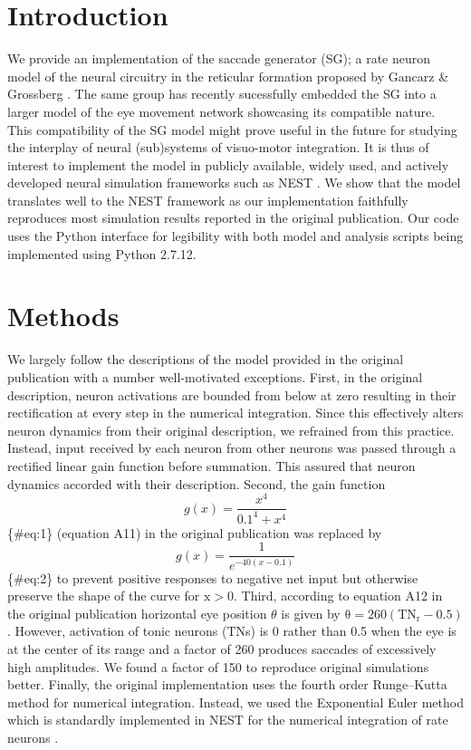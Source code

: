 \documentclass[10pt,a4paper,onecolumn]{article}
\begin{document}
\section{Introduction}\label{introduction}

We provide an implementation of the saccade generator (SG); a rate
neuron model of the neural circuitry in the reticular formation proposed
by Gancarz \& Grossberg \autocite{Gancarz1998}. The same group has
recently sucessfully embedded the SG into a larger model of the eye
movement network \autocite{Grossberg2012} showcasing its compatible
nature. This compatibility of the SG model might prove useful in the
future for studying the interplay of neural (sub)systems of visuo-motor
integration. It is thus of interest to implement the model in publicly
available, widely used, and actively developed neural simulation
frameworks such as NEST \autocite{Gewaltig2007}. We show that the model
translates well to the NEST framework as our implementation faithfully
reproduces most simulation results reported in the original publication.
Our code uses the Python interface \autocite{Eppler2008} for legibility
with both model and analysis scripts being implemented using Python
2.7.12.

\section{Methods}\label{methods}

We largely follow the descriptions of the model provided in the original
publication with a number well-motivated exceptions. First, in the
original description, neuron activations are bounded from below at zero
resulting in their rectification at every step in the numerical
integration. Since this effectively alters neuron dynamics from their
original description, we refrained from this practice. Instead, input
received by each neuron from other neurons was passed through a
rectified linear gain function before summation. This assured that
neuron dynamics accorded with their description. Second, the gain
function \[ g(x) = {\frac{x^4}{0.1^4+x^4}} \] \{\#eq:1\} (equation A11)
in the original publication was replaced by
\[ g(x) = {\frac{1}{e^{-40(x-0.1)}}} \] \{\#eq:2\} to prevent positive
responses to negative net input but otherwise preserve the shape of the
curve for \(\mathrm{x>0}\). Third, according to equation A12 in the
original publication horizontal eye position \(\theta\) is given by
\(\mathrm{\theta=260({TN}_{r}-0.5)}\). However, activation of tonic
neurons (TNs) is 0 rather than 0.5 when the eye is at the center of its
range and a factor of 260 produces saccades of excessively high
amplitudes. We found a factor of 150 to reproduce original simulations
better. Finally, the original implementation uses the fourth order
Runge--Kutta method for numerical integration. Instead, we used the
Exponential Euler method which is standardly implemented in NEST for the
numerical integration of rate neurons \autocite{Hahne2016}.
\end{document}
